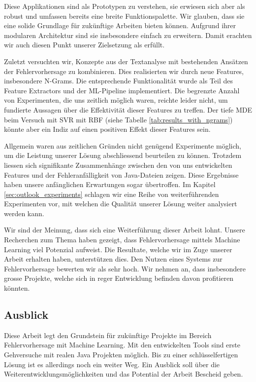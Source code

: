 \documentclass[10pt, a4paper]{article}
\begin{document}
Diese Applikationen sind als Prototypen zu verstehen, sie erwiesen sich aber als robust und umfassen bereits eine breite Funktionspalette. Wir glauben, dass sie eine solide Grundlage für zukünftige Arbeiten bieten können. Aufgrund ihrer modularen Architektur sind sie insbesondere einfach zu erweitern. Damit erachten wir auch diesen Punkt unserer Zielsetzung als erfüllt.

Zuletzt versuchten wir, Konzepte aus der Textanalyse mit bestehenden An\-sätz\-en der Fehlervorhersage zu kombinieren. Dies realisierten wir durch neue Features, insbesondere N-Grams. Die entsprechende Funktionalität wurde als Teil des Feature Extractors und der ML-Pipeline implementiert. Die begrenzte Anzahl von Experimenten, die uns zeitlich möglich waren, reichte leider nicht, um fundierte Aussagen über die Effektivität dieser Features zu treffen. Der tiefe \ac{MDE} beim Versuch mit \ac{SVR} mit \ac{RBF} (siehe Tabelle \ref{tab:results_with_ngrams}) könnte aber ein Indiz auf einen positiven Effekt dieser Features sein.

Allgemein waren aus zeitlichen Gründen nicht genügend Experimente mög\-lich, um die Leistung unserer Lösung abschliessend beurteilen zu können. Trotzdem liessen sich signifikante Zusammenhänge zwischen den von uns entwickelten Features und der Fehleranfälligkeit von Java-Dateien zeigen. Diese Ergebnisse haben unsere anfänglichen Erwartungen sogar übertroffen. Im Kapitel \ref{sec:outlook_experiments} schlagen wir eine Reihe von weiterführenden Experimenten vor, mit welchen die Qualität unserer Lösung weiter analysiert werden kann.

Wir sind der Meinung, dass sich eine Weiterführung dieser Arbeit lohnt. Unsere Recherchen zum Thema haben gezeigt, dass Fehlervorhersage mittels Machine Learning viel Potenzial aufweist. Die Resultate, welche wir im Zuge unserer Arbeit erhalten haben, unterstützen dies. Den Nutzen eines Systems zur Fehlervorhersage bewerten wir als sehr hoch. Wir nehmen an, dass insbesondere  grosse Projekte, welche sich in reger Entwicklung befinden davon profitieren könnten.


\subsection{Ausblick} \label{sec:outlook}

Diese Arbeit legt den Grundstein für zukünftige Projekte im Bereich Fehlervorhersage mit Machine Learning. Mit den entwickelten Tools sind erste Gehversuche mit realen Java Projekten möglich. Bis zu einer schlüsselfertigen Lösung ist es allerdings noch ein weiter Weg. Ein Ausblick soll über die Weiterentwicklungsmöglichkeiten und das Potential der Arbeit Bescheid geben.
\end{document}
